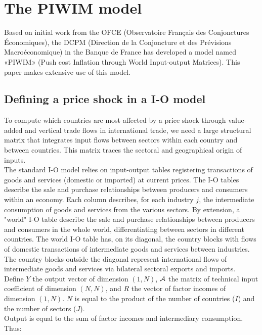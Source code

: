 \documentclass[11pt,a4paper]{article}
\begin{document}
\section{The PIWIM model }
\label{sec:metho}
Based on initial work from the OFCE (Observatoire Français des Conjonctures Économiques), the DCPM (Direction de la Conjoncture et des Prévisions Macroéconomique) in the Banque de France has developed a model named «PIWIM» (Push cost Inflation through World Input-output Matrices). This paper makes extensive use of this model.



\subsection{Defining a price shock in a I-O model}
\label{subsec:ioprice}
To compute which countries are most affected by a price shock through value-added and vertical trade flows in international trade, we need a large structural matrix that integrates input flows between sectors within each country and between countries. This matrix traces the sectoral and geographical origin of inputs. \\
The standard I-O model relies on input-output tables registering transactions of goods and services (domestic or imported) at current prices. The I-O tables describe the sale and purchase relationships between producers and consumers within an economy. Each column describes, for each industry $j$, the intermediate consumption of goods and services from the various sectors.
By extension, a "world" I-O table describe the sale and purchase relationships between producers and consumers in the whole world, differentiating between sectors in different countries.
The world I-O table has, on its diagonal, the country blocks with flows of domestic transactions of intermediate goods and services between industries.
The country blocks outside the diagonal represent international flows of intermediate goods and services via bilateral sectoral exports and imports. \\
Define $Y$ the output vector of dimension $(1, N)$, $\cal A$ the matrix of technical input coefficient of dimension $(N, N)$, and $R$ the vector of factor incomes of dimension $(1, N)$. $N$ is equal to the product of the number of countries ($I$) and the number of sectors ($J$). \\
Output is equal to the sum of factor incomes and intermediary consumption. Thus: 
\end{document}
